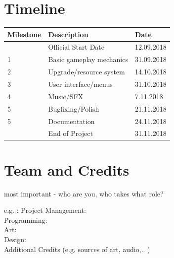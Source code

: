 \documentclass[a4paper]{scrreprt}
\begin{document}
\chapter{Timeline}
\begin{table}[h]
\centering
\begin{tabular}{|l|l|l|}
\hline
Milestone & Description & Date \\\hline
& Official Start Date & 12.09.2018 \\
1 & Basic gameplay mechanics  & 31.09.2018 \\
2 & Upgrade/resource system  & 14.10.2018 \\
3 & User interface/menus &31.10.2018 \\
4 & Music/SFX & 7.11.2018 \\
5 & Bugfixing/Polish & 21.11.2018 \\
5 & Documentation & 24.11.2018 \\
& End of Project & 31.11.2018 \\
\hline
\end{tabular}
\end{table}


\chapter{Team and Credits}

most important - who are you, who takes what role? 

e.g. :
Project Management: \\
Programming: \\ 
Art: \\ 
Design: \\ 

Additional Credits (e.g. sources of art, audio,.. ) 


%
%
\end{document}
